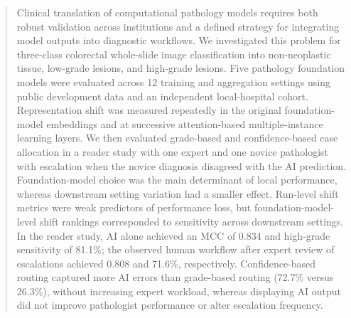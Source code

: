 \documentclass[runningheads]{llncs}
\begin{document}
\author{Shahryar Noei \and
Marcia Raquel Pegoraro De Macedo \and
Margherita Zordan \and
Matteo Pozzi \and
Francesco Giuseppe Carbone \and
Flavio Ragni \and
Stefano Bovo \and
Gisella Sidoti \and
Mattia Barbareschi \and
Giuseppe Jurman}
\maketitle              %
%
\begin{abstract}
Clinical translation of computational pathology models requires both robust
validation across institutions and a defined strategy for integrating model
outputs into diagnostic workflows. We investigated this problem for
three-class colorectal whole-slide image classification into non-neoplastic tissue,
low-grade lesions, and high-grade lesions. Five pathology foundation models
were evaluated across 12 training and aggregation settings using public
development data and an independent local-hospital cohort. Representation
shift was measured repeatedly in the original foundation-model embeddings
and at successive attention-based multiple-instance learning layers. We then evaluated 
grade-based and confidence-based case allocation in a reader study with one expert and one novice 
pathologist with escalation when the novice diagnosis disagreed with the AI prediction. 
Foundation-model choice was the main determinant of local performance, whereas downstream setting variation
had a smaller effect. Run-level shift metrics were weak predictors of
performance loss, but foundation-model-level shift rankings corresponded to
sensitivity across downstream settings. In the reader study, AI alone
achieved an MCC of 0.834 and high-grade sensitivity of 81.1\%; the observed
human workflow after expert review of escalations achieved 0.808 and 71.6\%,
respectively. Confidence-based routing captured more AI errors than
grade-based routing (72.7\% versus 26.3\%), without increasing expert
workload, whereas displaying AI output did not improve pathologist
performance or alter escalation frequency. 


\end{abstract}
%
%
%
\end{document}
